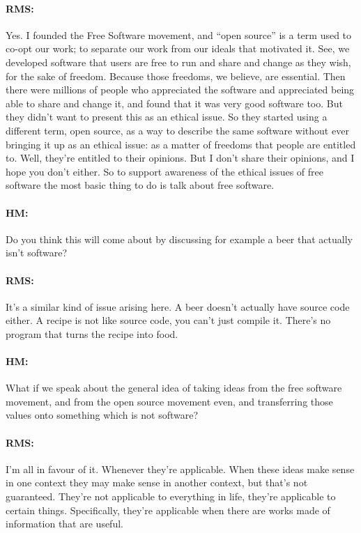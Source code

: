 \paragraph{RMS:}{Yes. I founded the Free Software movement, and ``open source''
is a term used to co-opt our work; to separate our work from our ideals that
motivated it. See, we developed software that users are free to run and share
and change as they wish, for the sake of freedom. Because those freedoms, we
believe, are essential. Then there were millions of people who appreciated the
software and appreciated being able to share and change it, and found that it
was very good software too. But they didn't want to present this as an ethical
issue. So they started using a dif\hbox{}ferent term, open source, as a way to
describe the same software without ever bringing it up as an ethical issue: as a
matter of freedoms that people are entitled to. Well, they're entitled to their
opinions. But I don't share their opinions, and I hope you don't either. So to
support awareness of the ethical issues of free software the most basic thing to
do is talk about free software.}

\paragraph{HM:}{Do you think this will come about by discussing for example a
beer that actually isn't software?}

\paragraph{RMS:}{It's a similar kind of issue arising here. A beer doesn't
actually have source code either. A recipe is not like source code, you can't
just compile it. There's no program that turns the recipe into food.}

\paragraph{HM:}{What if we speak about the general idea of taking ideas from the
free software movement, and from the open source movement even, and transferring
those values onto something which is not software?}

\paragraph{RMS:}{I'm all in favour of it. Whenever they're applicable. When
these ideas make sense in one context they may make sense in another context,
but that's not guaranteed. They're not applicable to everything in life, they're
applicable to certain things. Specif\hbox{}ically, they're applicable when there
are works made of information that are useful.}

